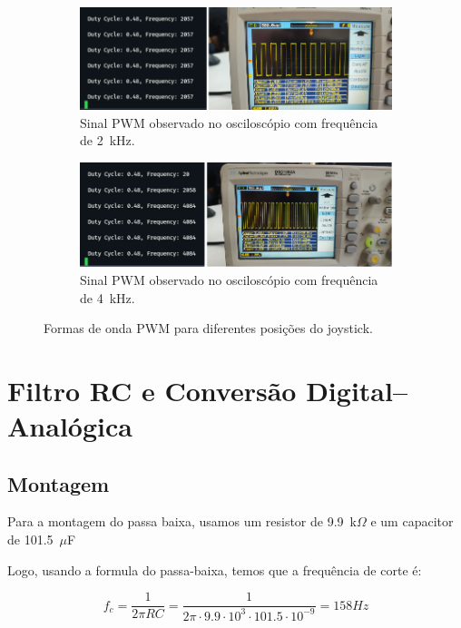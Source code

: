 \documentclass{article}
\begin{document}
\begin{figure}[h]
    \centering
    \begin{subfigure}{0.8\textwidth}
        \includegraphics[width=\textwidth]{fig/osciloscopio_2k.png}
        \caption{Sinal PWM observado no osciloscópio com frequência de 2~kHz.}
        \label{fig:pwm_2k}
    \end{subfigure}
    \begin{subfigure}{0.8\textwidth}
        \includegraphics[width=\textwidth]{fig/osciloscopio_4k.png}
        \caption{Sinal PWM observado no osciloscópio com frequência de 4~kHz.}
        \label{fig:pwm_4k}
    \end{subfigure}
    \caption{Formas de onda PWM para diferentes posições do joystick.}
    \label{fig:pwm_osciloscopio}
\end{figure}


\section{Filtro RC e Conversão Digital–Analógica }
\subsection{Montagem}
Para a montagem do passa baixa, usamos um resistor de 9.9~k$\Omega$ e um capacitor de 101.5~$\mu$F

Logo, usando a formula do passa-baixa, temos que a frequência de corte é:

\[
    f_c = \frac{1}{2\pi R C} = \frac{1}{2 \pi \cdot 9.9 \cdot 10^3 \cdot 101.5 \cdot 10^{-9}} = 158 Hz
\]
\end{document}
